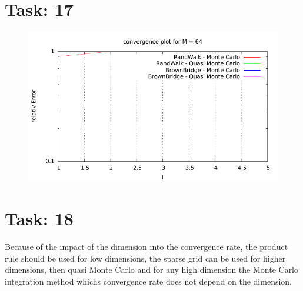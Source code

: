 \documentclass{article}
\begin{document}
\section*{Task: 17}

\begin{figure}[htbp]
  \centering
     \includegraphics[width=1.0\textwidth]{../Task17/sh3_task17_convergencePlot.pdf}
\end{figure}



\section*{Task: 18}

Because of the impact of the dimension into the convergence rate, 
the product rule should be used for low dimensions, 
the sparse grid can be used for higher dimensions, then quasi Monte Carlo and
for any high dimension the Monte Carlo integration method whichs convergence rate does not depend on the dimension. 
\end{document}
